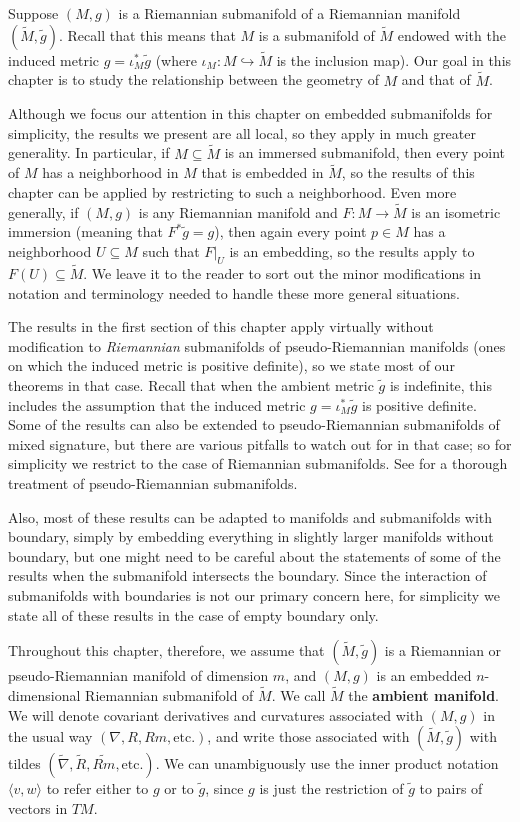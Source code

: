 Suppose $(M,g)$ is a Riemannian submanifold of a Riemannian manifold $(\tilde{M},\tilde{g})$. Recall that this means that $M$ is a submanifold of $\tilde{M}$ endowed with the induced metric $g = \iota_M^* \tilde{g}$ (where $\iota_M : M \hookrightarrow \tilde{M}$ is the inclusion map). Our goal in this chapter is to study the relationship between the geometry of $M$ and that of $\tilde{M}$.

Although we focus our attention in this chapter on embedded submanifolds for simplicity, the results we present are all local, so they apply in much greater generality. In particular, if $M \subseteq \tilde{M}$ is an immersed submanifold, then every point of $M$ has a neighborhood in $M$ that is embedded in $\tilde{M}$, so the results of this chapter can be applied by restricting to such a neighborhood. Even more generally, if $(M,g)$ is any Riemannian manifold and $F : M \to \tilde{M}$ is an isometric immersion (meaning that $F^* \tilde{g} = g$), then again every point $p \in M$ has a neighborhood $U \subseteq M$ such that $F|_U$ is an embedding, so the results apply to $F(U) \subseteq \tilde{M}$. We leave it to the reader to sort out the minor modifications in notation and terminology needed to handle these more general situations.

The results in the first section of this chapter apply virtually without modification to \textit{Riemannian} submanifolds of pseudo-Riemannian manifolds (ones on which the induced metric is positive definite), so we state most of our theorems in that case. Recall that when the ambient metric $\tilde{g}$ is indefinite, this includes the assumption that the induced metric $g = \iota_M^* \tilde{g}$ is positive definite. Some of the results can also be extended to pseudo-Riemannian submanifolds of mixed signature, but there are various pitfalls to watch out for in that case; so for simplicity we restrict to the case of Riemannian submanifolds. See \cite{dC92} for a thorough treatment of pseudo-Riemannian submanifolds.

Also, most of these results can be adapted to manifolds and submanifolds with boundary, simply by embedding everything in slightly larger manifolds without boundary, but one might need to be careful about the statements of some of the results when the submanifold intersects the boundary. Since the interaction of submanifolds with boundaries is not our primary concern here, for simplicity we state all of these results in the case of empty boundary only.

Throughout this chapter, therefore, we assume that $(\tilde{M}, \tilde{g})$ is a Riemannian or pseudo-Riemannian manifold of dimension $m$, and $(M,g)$ is an embedded $n$-dimensional Riemannian submanifold of $\tilde{M}$. We call $\tilde{M}$ the \textbf{ambient manifold}. We will denote covariant derivatives and curvatures associated with $(M,g)$ in the usual way $(\nabla, R, Rm, \text{etc.})$, and write those associated with $(\tilde{M}, \tilde{g})$ with tildes $(\tilde{\nabla}, \tilde{R}, \widetilde{Rm}, \text{etc.})$. We can unambiguously use the inner product notation $\langle v, w \rangle$ to refer either to $g$ or to $\tilde{g}$, since $g$ is just the restriction of $\tilde{g}$ to pairs of vectors in $TM$.

